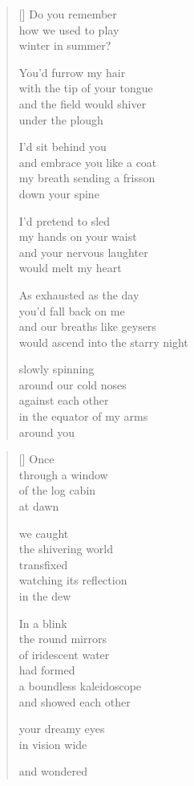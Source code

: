 \documentclass[12pt,a4paper]{article}
\begin{document}
\begin{verse}[\versewidth]
  Do you remember \\
  how we used to play \\
  winter in summer?

  You'd furrow my hair \\
  with the tip of your tongue \\
  and the field would shiver \\
  under the plough

  I'd sit behind you \\
  and embrace you like a coat \\
  my breath sending a frisson \\
  down your spine

  I'd pretend to sled \\
  my hands on your waist \\
  and your nervous laughter \\
  would melt my heart

  As exhausted as the day \\
  you'd fall back on me \\
  and our breaths like geysers \\
  would ascend into the starry night

  slowly spinning \\
  around our cold noses \\
  against each other \\
  in the equator of my arms \\
  around you
\end{verse}


\newpage

\poemtitle{}

\settowidth{\versewidth}{the infinite kaleidoscope}

\bigskip

\begin{verse}[\versewidth]
  Once \\
  through a window \\
  of the log cabin \\
  at dawn

  we caught \\
  the shivering world \\
  transfixed \\
  watching its reflection \\
  in the dew

  In a blink \\
  the round mirrors \\
  of iridescent water \\
  had formed \\
  a boundless kaleidoscope \\
  and showed each other

  your dreamy eyes \\
  in vision wide

  and wondered
\end{verse}
\end{document}
